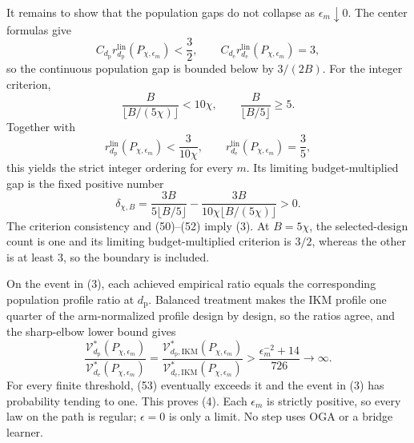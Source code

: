 It remains to show that the population gaps do not collapse as \(\epsilon_m\downarrow0\).  The center formulas give
\[
 C_{d_{\mathrm p}}r_{d_{\mathrm p}}^{\mathrm{lin}}(P_{\chi,\epsilon_m})<\frac32,
 \qquad
 C_{d_{\mathrm e}}r_{d_{\mathrm e}}^{\mathrm{lin}}(P_{\chi,\epsilon_m})=3, \tag{50}
\]
so the continuous population gap is bounded below by \(3/(2B)\).  For the integer criterion,
\[
 \frac{B}{\lfloor B/(5\chi)\rfloor}<10\chi,
 \qquad
 \frac{B}{\lfloor B/5\rfloor}\ge5.                       \tag{51}
\]
Together with
\[
 r_{d_{\mathrm p}}^{\mathrm{lin}}(P_{\chi,\epsilon_m})<\frac3{10\chi},
 \qquad r_{d_{\mathrm e}}^{\mathrm{lin}}(P_{\chi,\epsilon_m})=\frac35,
\]
this yields the strict integer ordering for every \(m\).  Its limiting budget-multiplied gap is the fixed positive number
\[
 \delta_{\chi,B}=
 \frac{3B}{5\lfloor B/5\rfloor}
 -\frac{3B}{10\chi\lfloor B/(5\chi)\rfloor}>0.            \tag{52}
\]
The criterion consistency and (50)--(52) imply (3).  At \(B=5\chi\), the selected-design count is one and its limiting budget-multiplied criterion is \(3/2\), whereas the other is at least \(3\), so the boundary is included.

On the event in (3), each achieved empirical ratio equals the corresponding population profile ratio at \(d_{\mathrm p}\).  Balanced treatment makes the IKM profile one quarter of the arm-normalized profile design by design, so the ratios agree, and the sharp-elbow lower bound gives
\[
 \frac{\mathcal V_{d_{\mathrm p}}^*(P_{\chi,\epsilon_m})}
 {\mathcal V_{d_{\mathrm e}}^*(P_{\chi,\epsilon_m})}
 =\frac{\mathcal V_{d_{\mathrm p},\mathrm{IKM}}^*(P_{\chi,\epsilon_m})}
 {\mathcal V_{d_{\mathrm e},\mathrm{IKM}}^*(P_{\chi,\epsilon_m})}
 >\frac{\epsilon_m^{-2}+14}{726}\longrightarrow\infty.  \tag{53}
\]
For every finite threshold, (53) eventually exceeds it and the event in (3) has probability tending to one.  This proves (4).  Each \(\epsilon_m\) is strictly positive, so every law on the path is regular; \(\epsilon=0\) is only a limit.  No step uses OGA or a bridge learner.